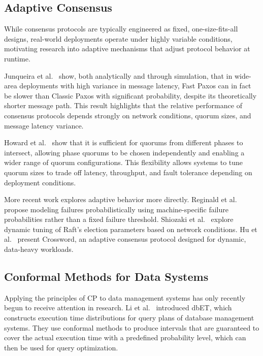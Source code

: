 \subsection{Adaptive Consensus}
While consensus protocols are typically engineered as fixed, one-size-fits-all designs, real-world deployments operate under highly variable conditions, motivating research into adaptive mechanisms that adjust protocol behavior at runtime.

Junqueira et al.~\cite{Junqueira-ClassicVsFastPaxos-2007} show, both analytically and through simulation, that in wide-area deployments with high variance in message latency, Fast Paxos can in fact be slower than Classic Paxos with significant probability, despite its theoretically shorter message path. This result highlights that the relative performance of consensus protocols depends strongly on network conditions, quorum sizes, and message latency variance.

Howard et al.~\cite{Howard-FlexiblePaxos-2016} show that it is sufficient for quorums from different phases to intersect, allowing phase quorums to be chosen independently and enabling a wider range of quorum configurations. This flexibility allows systems to tune quorum sizes to trade off latency, throughput, and fault tolerance depending on deployment conditions.

More recent work explores adaptive behavior more directly. Reginald et al.~\cite{Reginald-ConsensusUncertainty-2025} propose modeling failures probabilistically using machine-specific failure probabilities rather than a fixed failure threshold. Shiozaki et al.~\cite{Shiozaki-DynamicRaftTuning-2025} explore dynamic tuning of Raft’s election parameters based on network conditions. Hu et al.~\cite{Hu-AdaptiveConsensus-2025} present Crossword, an adaptive consensus protocol designed for dynamic, data-heavy workloads.

\subsection{Conformal Methods for Data Systems}
Applying the principles of \gls{CP} to data management systems has only recently begun to receive attention in research. Li et al.~\cite{Li-ConformalPredictionPlanSelection-2023} introduced dbET, which constructs execution time distributions for query plans of database management systems. They use conformal methods to produce intervals that are guaranteed to cover the actual execution time with a predefined probability level, which can then be used for query optimization.


